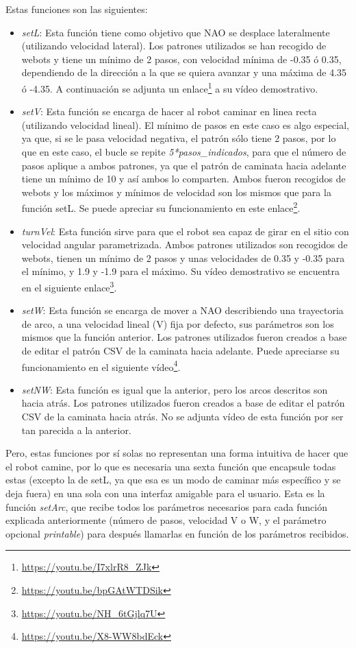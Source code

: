 Estas funciones son las siguientes:
\begin{itemize}
    \item \textit{setL}: Esta función tiene como objetivo que NAO se desplace lateralmente (utilizando velocidad lateral). Los patrones utilizados se han recogido de webots y tiene un mínimo de 2 pasos, con velocidad mínima de -0.35 ó 0.35, dependiendo de la dirección a la que se quiera avanzar y una máxima de 4.35 ó -4.35. A continuación se adjunta un enlace\footnote{\url{https://youtu.be/I7xlrR8_ZJk}} a su vídeo demostrativo.
    \item \textit{setV}: Esta función se encarga de hacer al robot caminar en linea recta (utilizando velocidad lineal). El mínimo de pasos en este caso es algo especial, ya que, si se le pasa velocidad negativa, el patrón sólo tiene 2 pasos, por lo que en este caso, el bucle se repite \textit{5*pasos\_indicados}, para que el número de pasos aplique a ambos patrones, ya que el patrón de caminata hacia adelante tiene un mínimo de 10 y así ambos lo comparten. Ambos fueron recogidos de webots y los máximos y mínimos de velocidad son los mismos que para la función setL. Se puede apreciar su funcionamiento en este enlace\footnote{\url{https://youtu.be/bpGAtWTDSik}}.
    \item \textit{turnVel}: Esta función sirve para que el robot sea capaz de girar en el sitio con velocidad angular parametrizada. Ambos patrones utilizados son recogidos de webots, tienen un mínimo de 2 pasos y unas velocidades de 0.35 y -0.35 para el mínimo, y 1.9 y -1.9 para el máximo. Su vídeo demostrativo se encuentra en el siguiente enlace\footnote{\url{https://youtu.be/NH_6tGjlq7U}}.
    \item \textit{setW}: Esta función se encarga de mover a NAO describiendo una trayectoria de arco, a una velocidad lineal (V) fija por defecto, sus parámetros son los mismos que la función anterior. Los patrones utilizados fueron creados a base de editar el patrón CSV de la caminata hacia adelante. Puede apreciarse su funcionamiento en el siguiente vídeo\footnote{\url{https://youtu.be/X8-WW8bdEck}}.
    \item \textit{setNW}: Esta función es igual que la anterior, pero los arcos descritos son hacia atrás. Los patrones utilizados fueron creados a base de editar el patrón CSV de la caminata hacia atrás. No se adjunta vídeo de esta función por ser tan parecida a la anterior.
\end{itemize}

Pero, estas funciones por sí solas no representan una forma intuitiva de hacer que el robot camine, por lo que es necesaria una sexta función que encapsule todas estas (excepto la de setL, ya que esa es un modo de caminar más específico y se deja fuera) en una sola con una interfaz amigable para el usuario. Esta es la función \textit{setArc}, que recibe todos los parámetros necesarios para cada función explicada anteriormente (número de pasos, velocidad V o W, y el parámetro opcional \textit{printable}) para después llamarlas en función de los parámetros recibidos.

